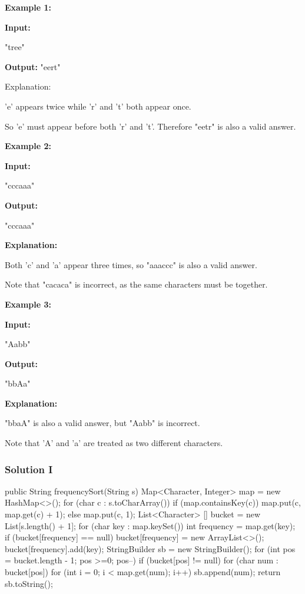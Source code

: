 \textbf{Example 1:}

\textbf{Input:}

"tree"

\textbf{Output:}
"eert"

\textbf{}Explanation:

'e' appears twice while 'r' and 't' both appear once.

So 'e' must appear before both 'r' and 't'. Therefore "eetr" is also a valid answer.

\textbf{Example 2:}

\textbf{Input:}

"cccaaa"

\textbf{Output:}

"cccaaa"

\textbf{Explanation:}

Both 'c' and 'a' appear three times, so "aaaccc" is also a valid answer.

Note that "cacaca" is incorrect, as the same characters must be together.

\textbf{Example 3:}

\textbf{Input:}

"Aabb"

\textbf{Output:}

"bbAa"

\textbf{Explanation:}

"bbaA" is also a valid answer, but "Aabb" is incorrect.

Note that 'A' and 'a' are treated as two different characters.

\newpage

\subsubsection{Solution I}

\begin{Code}
public String frequencySort(String s) {
    Map<Character, Integer> map = new HashMap<>();
    for (char c : s.toCharArray()) {
        if (map.containsKey(c)) {
            map.put(c, map.get(c) + 1);
        } else {
            map.put(c, 1);
        }
    }
    List<Character> [] bucket = new List[s.length() + 1];
    for (char key : map.keySet()) {
        int frequency = map.get(key);
        if (bucket[frequency] == null) {
            bucket[frequency] = new ArrayList<>();
        }
        bucket[frequency].add(key);
    }
    StringBuilder sb = new StringBuilder();
    for (int pos = bucket.length - 1; pos >=0; pos--) {
        if (bucket[pos] != null) {
            for (char num : bucket[pos]) {
                for (int i = 0; i < map.get(num); i++) {
                    sb.append(num);
                }
            }
        }
    }
    return sb.toString();
}

\end{Code}

